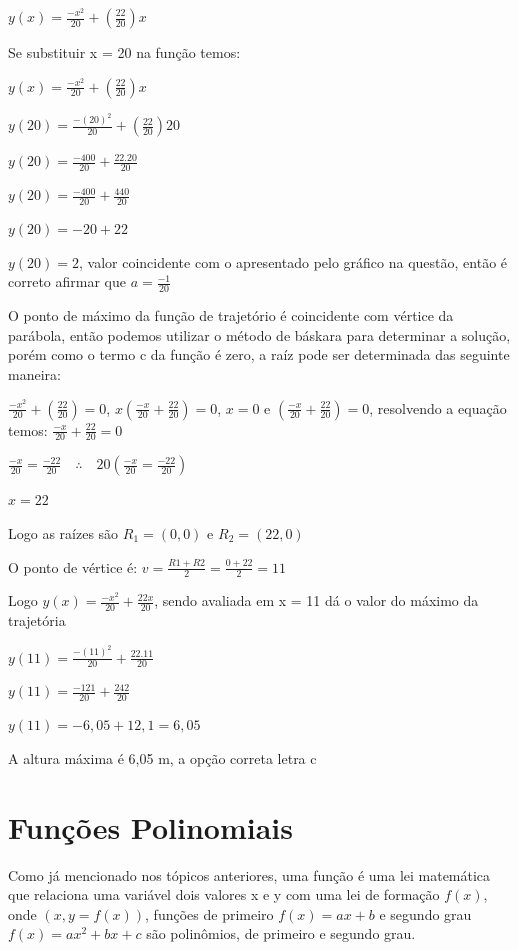 \begin{multicols*}{2}
    $y(x) = \frac{-x^2}{20} + \left(  \frac{22 }{20} \right)x$

    Se substituir x = 20 na função temos:

    $y(x) = \frac{-x^2}{20} + \left(  \frac{22 }{20} \right)x$

    $y(20) = \frac{-(20)^2}{20} + \left(  \frac{22 }{20} \right)20$

    $y(20) = \frac{-400}{20} + \frac{22 . 20}{20}$

    $y(20) = \frac{-400}{20} + \frac{440}{20}$

    $y(20) = -20 + 22$

    $y(20) = 2$, valor coincidente com o apresentado pelo gráfico na questão, então é correto 				afirmar que $a = \frac{-1}{20}$

    O ponto de máximo da função de trajetório é coincidente com vértice da parábola, então podemos 			utilizar o método de báskara para determinar a solução, porém como o termo c da função é zero, 			a raíz pode ser determinada das seguinte maneira:

    $\frac{-x^2}{20} + \left(  \frac{22 }{20} \right) = 0$,
    $x \left(    \frac{-x}{20} + \frac{22}{20} \right) = 0$,
    $x = 0$ e $\left(    \frac{-x}{20} + \frac{22}{20} \right) = 0$, resolvendo a equação temos:
    $    \frac{-x}{20} + \frac{22}{20}  = 0$

    $\frac{-x}{20} = \frac{- 22}{20} \quad \therefore \quad
        20 \left( \frac{-x}{20} = \frac{- 22}{20} \right)$

    $x = 22$

    Logo as raízes são $R_1 = (0,0)$ e $R_2 = (22,0)$

    O ponto de vértice é: $v =\frac{R1 + R2}{2} =\frac{0 + 22}{2} = 11 $

    Logo $y(x) = \frac{-x^2}{20} + \frac{22x}{20}$, sendo avaliada em x = 11 dá o valor do máximo 			da trajetória

    $y(11) = \frac{-(11)^2}{20} + \frac{22.11}{20} $

    $y(11) = \frac{-121}{20} + \frac{242}{20} $

    $y(11) = -6,05 + 12,1  = 6,05 $

    A altura máxima é 6,05 m, a opção correta letra c


    \section*{Funções Polinomiais}
    Como já mencionado nos tópicos anteriores, uma função é uma lei matemática que relaciona uma 			variável dois valores x e y com uma lei de formação $f(x)$, onde $(x, y = f(x))$, funções de 			primeiro $f(x) = ax + b$ e segundo grau $f(x) = ax^2 + bx + c$ são polinômios, de primeiro e 			segundo grau.


\end{multicols*}
